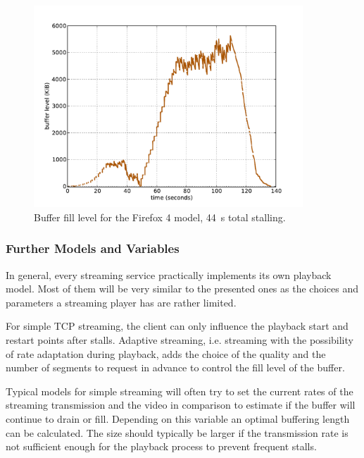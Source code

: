  \begin{figure}[htb]
    \centering
    \includegraphics[width=0.9\textwidth]{images/bufferlevel-firefox-new.pdf}
    \caption{Buffer fill level for the Firefox 4 model, \SI{44}{\second} total stalling.}
    \label{c3:fig:bufferlevel-firefox}
\end{figure}




\subsubsection{Further Models and Variables}
In general, every streaming service practically implements its own playback model. Most of them will be very similar to the presented ones as the choices and parameters a streaming player has are rather limited.

For simple TCP streaming, the client can only influence the playback start and restart points after stalls. Adaptive streaming, i.e. streaming with the possibility of rate adaptation during playback, adds the choice of the quality and the number of segments to request in advance to control the fill level of the buffer.

Typical models for simple streaming will often try to set the current rates of the streaming transmission and the video in comparison to estimate if the buffer will continue to drain or fill. Depending on this variable an optimal buffering length can be calculated. The size should typically be larger if the transmission rate is not sufficient enough for the playback process to prevent frequent stalls.





